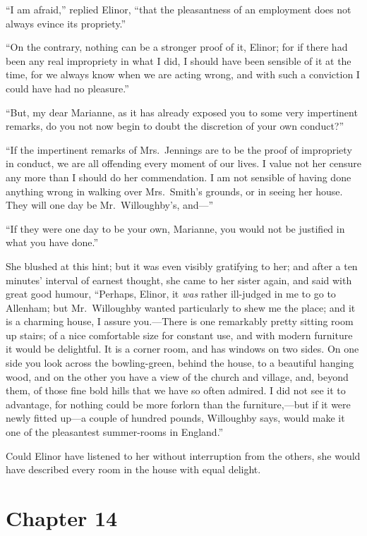 ``I am afraid,'' replied Elinor, ``that the pleasantness
of an employment does not always evince its propriety.''

``On the contrary, nothing can be a stronger proof
of it, Elinor; for if there had been any real impropriety
in what I did, I should have been sensible of it at
the time, for we always know when we are acting wrong,
and with such a conviction I could have had no pleasure.''

``But, my dear Marianne, as it has already exposed you
to some very impertinent remarks, do you not now begin
to doubt the discretion of your own conduct?''

``If the impertinent remarks of Mrs.\ Jennings are
to be the proof of impropriety in conduct, we are all
offending every moment of our lives.  I value not her
censure any more than I should do her commendation.
I am not sensible of having done anything wrong in walking
over Mrs.\ Smith's grounds, or in seeing her house.
They will one day be Mr.\ Willoughby's, and---''

``If they were one day to be your own, Marianne,
you would not be justified in what you have done.''

She blushed at this hint; but it was even visibly
gratifying to her; and after a ten minutes' interval of
earnest thought, she came to her sister again, and said
with great good humour, ``Perhaps, Elinor, it \emph{was} rather
ill-judged in me to go to Allenham; but Mr.\ Willoughby wanted
particularly to shew me the place; and it is a charming house,
I assure you.---There is one remarkably pretty sitting room
up stairs; of a nice comfortable size for constant use,
and with modern furniture it would be delightful.
It is a corner room, and has windows on two sides.
On one side you look across the bowling-green, behind
the house, to a beautiful hanging wood, and on the other you
have a view of the church and village, and, beyond them,
of those fine bold hills that we have so often admired.
I did not see it to advantage, for nothing could be
more forlorn than the furniture,---but if it were newly
fitted up---a couple of hundred pounds, Willoughby says,
would make it one of the pleasantest summer-rooms
in England.''

Could Elinor have listened to her without interruption
from the others, she would have described every room
in the house with equal delight.



\chapter{Chapter 14}


